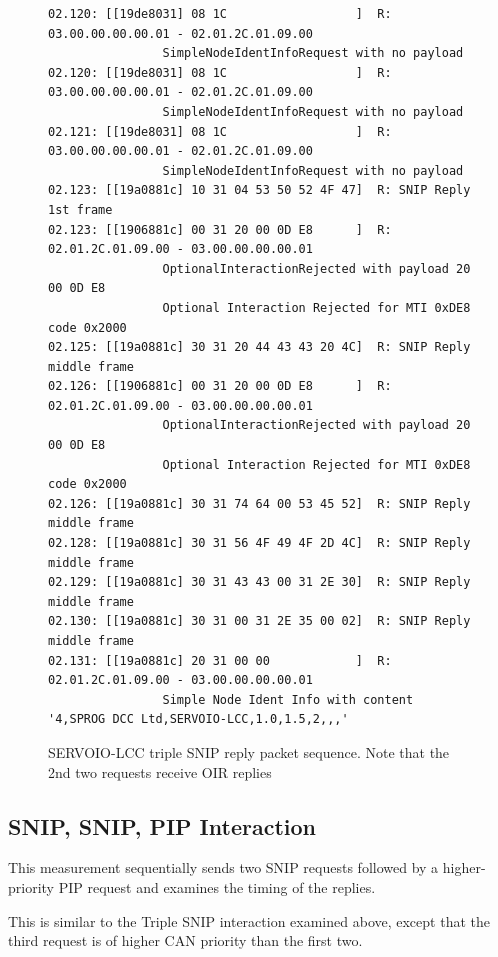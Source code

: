\documentclass[11pt]{article}
\begin{document}
\cbstart
\begin{figure}[!htbp]
\begin{verbatim}
02.120: [[19de8031] 08 1C                  ]  R: 03.00.00.00.00.01 - 02.01.2C.01.09.00 
                SimpleNodeIdentInfoRequest with no payload
02.120: [[19de8031] 08 1C                  ]  R: 03.00.00.00.00.01 - 02.01.2C.01.09.00 
                SimpleNodeIdentInfoRequest with no payload
02.121: [[19de8031] 08 1C                  ]  R: 03.00.00.00.00.01 - 02.01.2C.01.09.00 
                SimpleNodeIdentInfoRequest with no payload
02.123: [[19a0881c] 10 31 04 53 50 52 4F 47]  R: SNIP Reply 1st frame
02.123: [[1906881c] 00 31 20 00 0D E8      ]  R: 02.01.2C.01.09.00 - 03.00.00.00.00.01 
                OptionalInteractionRejected with payload 20 00 0D E8 
                Optional Interaction Rejected for MTI 0xDE8 code 0x2000
02.125: [[19a0881c] 30 31 20 44 43 43 20 4C]  R: SNIP Reply middle frame
02.126: [[1906881c] 00 31 20 00 0D E8      ]  R: 02.01.2C.01.09.00 - 03.00.00.00.00.01 
                OptionalInteractionRejected with payload 20 00 0D E8 
                Optional Interaction Rejected for MTI 0xDE8 code 0x2000
02.126: [[19a0881c] 30 31 74 64 00 53 45 52]  R: SNIP Reply middle frame
02.128: [[19a0881c] 30 31 56 4F 49 4F 2D 4C]  R: SNIP Reply middle frame
02.129: [[19a0881c] 30 31 43 43 00 31 2E 30]  R: SNIP Reply middle frame
02.130: [[19a0881c] 30 31 00 31 2E 35 00 02]  R: SNIP Reply middle frame
02.131: [[19a0881c] 20 31 00 00            ]  R: 02.01.2C.01.09.00 - 03.00.00.00.00.01 
                Simple Node Ident Info with content '4,SPROG DCC Ltd,SERVOIO-LCC,1.0,1.5,2,,,'
\end{verbatim}
\caption{SERVOIO-LCC triple SNIP reply packet sequence.
Note that the 2nd two requests receive OIR replies}
\label{fig:SERVOIO_Triple_SNIP_reply_sequence}
\end{figure}
\cbend





\clearpage

\subsection{SNIP, SNIP, PIP Interaction}

This measurement sequentially sends two SNIP requests followed by a higher-priority PIP request
and examines the timing of the replies.

This is similar to the Triple SNIP interaction examined above, except that
the third request is of higher CAN priority than the first two.
\end{document}
